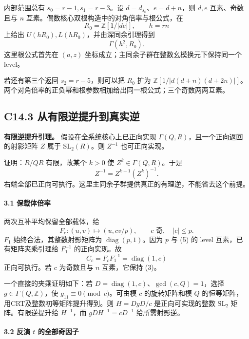 \documentclass[11pt,a4paper]{article}
\theoremstyle{definition}
\numberwithin{equation}{section}
\begin{document}
{内部范围总有} \(s_0=r-1,s_1=r-3\){。设} \(d=d_{s_0}\){、}\(e=d+n\){，则} \(d,e\) {互素、奇数且与} \(n\) {互素。偶数核心双根构造中的对角倍率与根公式，在} \[
R_0=\mathbb Z[1/|de|],\qquad h=rn
\] {上给出} \(U(hR_0),L(hR_0)\){，并由深同余引理得到} \[
\Gamma(h^2,R_0).\tag{C14.5}
\] {这里根公式首先在} \((a,z)\) {坐标成立；主同余子群在整数幺模换元下保持同一个} {level。}

{若还有第三个返回} \(s_2=r-5\){，则可以把} \(R_0\) {扩为} \(\mathbb Z[1/|d(d+n)(d+2n)|]\){。两个对角倍率的正负幂和根参数相加给出同一根公式；三个奇数两两互素。}

\subsection*{\texorpdfstring{{C14.3} {从有限逆提升到真实逆}}{C14.3 从有限逆提升到真实逆}}\label{C14-h93}

\textbf{{有限逆提升引理。}} {假设在全系统核心上已正向实现} \(\Gamma(Q,R)\){，且一个正向返回的射影矩阵} \(Z\) {属于} \(\mathrm{SL}_2(R)\){。则} \(Z^{-1}\) {也可正向实现。}

{证明：}\(R/QR\) {有限，故某个} \(k>0\) {使} \(Z^k\in\Gamma(Q,R)\){。于是} \[
Z^{-1}=Z^{k-1}(Z^k)^{-1}.
\] {右端全部已正向可执行。这里主同余子群提供真正的有理逆，不能省去这个前提。}

\paragraph*{\texorpdfstring{{3.1} {保载体倍率}}{3.1 保载体倍率}}\label{C14-h94}

{两次互补平均保留全部载体，给} \[
F_c:(u,v)\mapsto(u,cv/p),\qquad c\text{ 奇},\quad |c|\le p.
\] \(F_1\) {始终合法，其整数射影矩阵为} \(\operatorname{diag}(p,1)\){。因为} \(p\) {与} {(5)} {的} {level} {互素，已有矩阵夹乘引理给} \(F_1^{-1}\) {的正向实现。故} \[
C_c=F_cF_1^{-1}=\operatorname{diag}(1,c)\tag{C14.6}
\] {正向可执行。若} \(c\) {为奇数且与} \(n\) {互素，它保持} {(3)。}

{一个直接的夹乘证明如下：若} \(D=\operatorname{diag}(1,c)\){、}\(\gcd(c,Q)=1\){，选择} \(g\in\Gamma(Q,\mathbb Z)\){，使} \(g_{11}\equiv0\pmod c\){。可由模} \(c\) {的旋转矩阵和模} \(Q\) {的恒等矩阵，用CRT及整数初等矩阵提升得到。则} \(H=DgD/c\) {是正向可实现的整数} \(\mathrm{SL}_2\) {矩阵。有限逆提升给} \(H^{-1}\){，而} \(gDH^{-1}=cD^{-1}\) {给所需射影逆。}

\paragraph*{\texorpdfstring{{3.2} {反演} \(t\) {的全部奇因子}}{3.2 反演 t 的全部奇因子}}\label{C14-h95}
\end{document}
